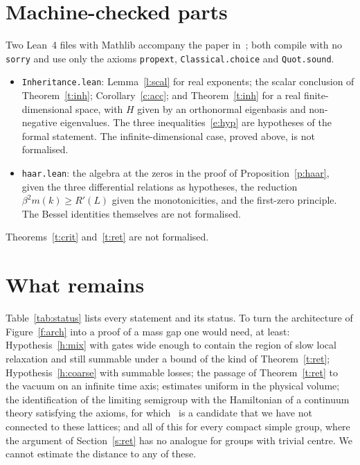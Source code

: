 \section{Machine-checked parts}\label{s:lean}
Two Lean~4 files with Mathlib accompany the paper in~\cite{Repo}; both compile with no \texttt{sorry} and use
only the axioms \texttt{propext}, \texttt{Classical.choice} and \texttt{Quot.sound}.
\begin{itemize}
\item \texttt{Inheritance.lean}: Lemma~\ref{l:scal} for real exponents; the scalar conclusion of
Theorem~\ref{t:inh}; Corollary~\ref{c:acc}; and Theorem~\ref{t:inh} for a real finite-dimensional space, with
$H$ given by an orthonormal eigenbasis and non-negative eigenvalues. The three inequalities~\eqref{e:hyp}
are hypotheses of the formal statement. The infinite-dimensional case, proved above, is not formalised.
\item \texttt{haar.lean}: the algebra at the zeros in the proof of Proposition~\ref{p:haar}, given the three
differential relations as hypotheses, the reduction $\beta^2m(k)\ge R'(L)$ given the monotonicities, and the
first-zero principle. The Bessel identities themselves are not formalised.
\end{itemize}
Theorems~\ref{t:crit} and~\ref{t:ret} are not formalised.

\section{What remains}\label{s:rem}
Table~\ref{tab:status} lists every statement and its status. To turn the architecture of
Figure~\ref{f:arch} into a proof of a mass gap one would need, at least: Hypothesis~\ref{h:mix} with gates wide
enough to contain the region of slow local relaxation and still summable under a bound of the kind of
Theorem~\ref{t:ret}; Hypothesis~\ref{h:coarse} with summable losses; the passage of Theorem~\ref{t:ret} to the
vacuum on an infinite time axis; estimates uniform in the physical volume; the identification of the limiting
semigroup with the Hamiltonian of a continuum theory satisfying the axioms, for which~\cite{OAI} is a
candidate that we have not connected to these lattices; and all of this for every compact simple group, where
the argument of Section~\ref{s:ret} has no analogue for groups with trivial centre. We cannot estimate the
distance to any of these.

